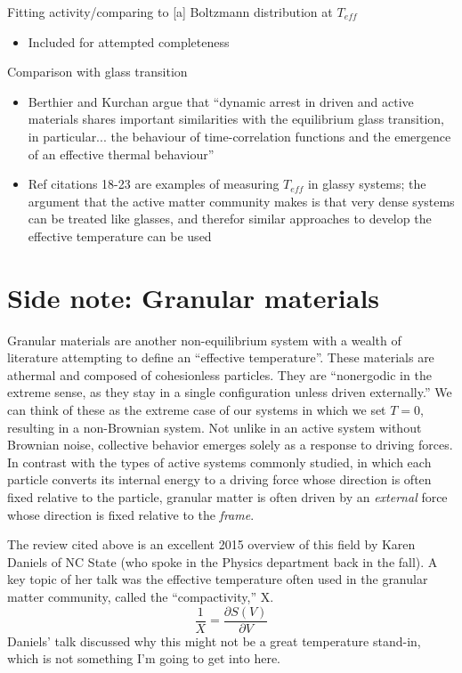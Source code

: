 \documentclass[11pt]{article}   	%
\begin{document}
Fitting activity/comparing to [a] Boltzmann distribution at $T_{eff}$
\begin{itemize}
\item Included for attempted completeness
\end{itemize}

Comparison with glass transition
\begin{itemize}
\item Berthier and Kurchan argue that ``dynamic arrest in driven and active materials shares important similarities with the equilibrium glass transition, in particular... the behaviour of time-correlation functions and the emergence of an effective thermal behaviour''
\item Ref \cite{LoiEA_2011_SoftMatter} citations 18-23 are examples of measuring $T_{eff}$ in glassy systems; the argument that the active matter community makes is that very dense systems can be treated like glasses, and therefor similar approaches to develop the effective temperature can be used
\end{itemize}

\section{Side note: Granular materials}
Granular materials are another non-equilibrium system with a wealth of literature attempting to define an ``effective temperature''. These materials are athermal and composed of cohesionless particles. They are ``nonergodic in the extreme sense, as they stay in a single configuration unless driven externally.'' We can think of these as the extreme case of our systems in which we set $T=0$, resulting in a non-Brownian system. Not unlike in an active system without Brownian noise, collective behavior emerges solely as a response to driving forces. In contrast with the types of active systems commonly studied, in which each particle converts its internal energy to a driving force whose direction is often fixed relative to the particle, granular matter is often driven by an \textit{external} force whose direction is fixed relative to the \textit{frame}. \cite{BiEA_2015_AnnRevConMatPhys}

The review cited above is an excellent 2015 overview of this field by Karen Daniels of NC State (who spoke in the Physics department back in the fall). A key topic of her talk was the effective temperature often used in the granular matter community, called the ``compactivity,'' X. 
\begin{equation}
\frac{1}{X} = \frac{\partial S(V)}{\partial V}
\end{equation}
Daniels' talk discussed why this might not be a great temperature stand-in, which is not something I'm going to get into here.


\begin{singlespacing}

\end{singlespacing}
\end{document}
